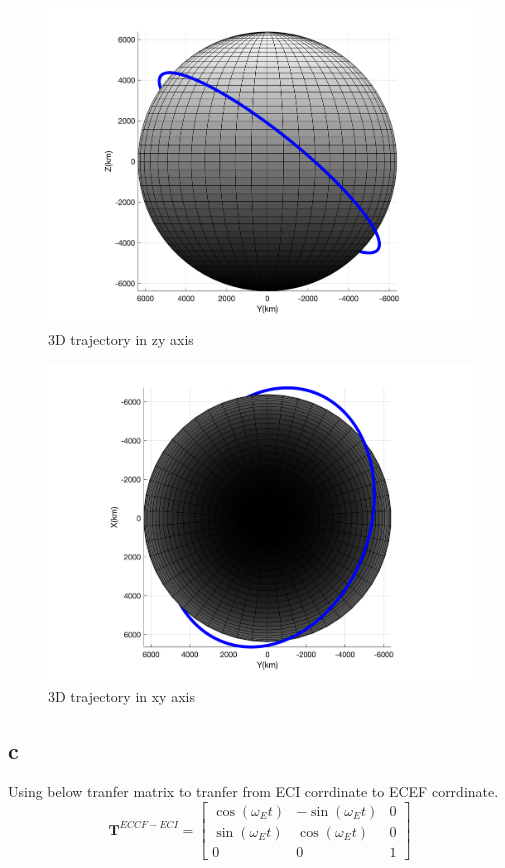    \begin{figure}[H]
        \caption{3D trajectory in zy axis}
        \centering
        \includegraphics[width=16cm]{../Figure/Short_project/yz_view.png}
    \end{figure}

    \begin{figure}[H]
        \caption{3D trajectory in xy axis}
        \centering
        \includegraphics[width=16cm]{../Figure/Short_project/xy_view.png}
    \end{figure}

    \subsection{c}
    Using below tranfer matrix to tranfer from ECI corrdinate to ECEF corrdinate.
    $$
    \boldsymbol T^{ECCF-ECI} = \begin{bmatrix}
        \cos(\omega_Et) & -\sin(\omega_Et)& 0\\
        \sin(\omega_Et) &  \cos(\omega_Et)& 0\\
                0       &      0          & 1
    \end{bmatrix}
    $$

